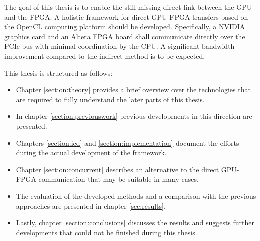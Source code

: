 The goal of this thesis is to enable the still missing direct link between the GPU and the FPGA.
A holistic framework for direct GPU-FPGA transfers based on the OpenCL computing platform should be developed.
Specifically, a NVIDIA graphics card and an Altera FPGA board shall communicate directly over the PCIe bus with minimal coordination by the CPU.
A significant bandwidth improvement compared to the indirect method is to be expected.



This thesis is structured as follows:
\begin{itemize}
	
\item Chapter \ref{section:theory} provides a brief overview over the technologies that are required to fully understand the later parts of this thesis.
\item In chapter \ref{section:previouswork} previous developments in this direction are presented. %
\item Chapters \ref{section:icd} and \ref{section:implementation} document the efforts during the actual development of the framework.
\item Chapter \ref{section:concurrent} describes an alternative to the direct GPU-FPGA communication that may be suitable in many cases.
\item The evaluation of the developed methods and a comparison with the previous approaches are presented in chapter \ref{sec:results}.
\item Lastly, chapter \ref{section:conclusions} discusses the results and suggests further developments that could not be finished during this thesis.

\end{itemize}





